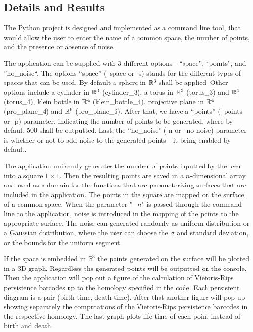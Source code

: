 \documentclass[11pt,a4paper]{report}
\begin{document}
            \subsection{Details and Results}

            The Python project is designed and implemented as a command line tool, that would allow the user to enter the name
            of a common space, the number of points, and the presence or absence of noise.

            The application can be supplied with 3 different options - ``space'', ``points'', and ''no\_noise``. The options ``space'' (--space or -s) stands for the different types of spaces that can be used. By default a sphere in $\mathbb{R}^3$  shall be applied. Other options include a cylinder in $\mathbb{R}^3$ (cylinder\_3), a torus in $\mathbb{R}^3$ (torus\_3) and $\mathbb{R}^4$ (torus\_4), klein bottle in $\mathbb{R}^4$ (klein\_bottle\_4), projective plane in $\mathbb{R}^4$ (pro\_plane\_4) and $\mathbb{R}^6$ (pro\_plane\_6). After that, we have a ``points'' (--points or -p) parameter, indicating the number of points to be generated, where by default 500 shall be outputted. Last, the ``no\_noise'' (-n or --no-noise) parameter is whether or not to add noise to the generated points - it being enabled by default.

            The application uniformly generates the number of points inputted by the user into a square $1 \times 1$. Then the resulting points are saved in a $n$-dimensional array and used as a domain for the functions that are parameterizing surfaces that are included in the application. The points in the square are mapped on the surface of a common space. When the parameter "$-n$" is passed through the command line to the application, noise is introduced in the mapping of the points to the appropriate surface. The noise can generated randomly as uniform distribution or a Gaussian distribution, where the user can choose the $\sigma$ and standard deviation, or the bounds for the uniform segment.

            If the space is embedded in $\mathbb{R}^3$ the points generated on the surface will be plotted in a 3D graph. Regardless the generated points will be outputted on the console. Then the application will pop out a figure of the calculation of Vietoris-Rips persistence barcodes up to the homology specified in the code. Each persistent diagram is a pair (birth time, death time). After that another figure will pop up showing separately the computations of the Vietoris-Rips persistence barcodes in the respective homology. The last graph plots life time of each point instead of birth and death.
\end{document}
